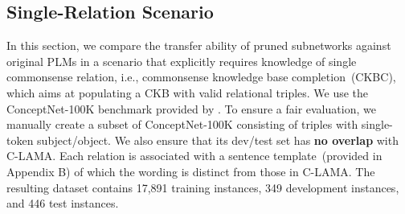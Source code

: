 \subsection{Single-Relation Scenario}
\label{sec:ckbc}
In this section, we compare the transfer ability of pruned subnetworks against original PLMs in 
a scenario that explicitly requires knowledge of single commonsense relation, 
i.e., commonsense knowledge base completion~(CKBC), which aims at populating a CKB with 
valid relational triples. We use the ConceptNet-100K benchmark provided by \citet{Li2016}. 
To ensure a fair evaluation, we manually create a subset of ConceptNet-100K 
consisting of triples with single-token subject/object. 
We also ensure that its dev/test set has \textbf{no overlap} with C-LAMA.
Each relation is associated with a sentence template~(provided in 
Appendix B) of which the wording is distinct from those in C-LAMA. 
The resulting dataset contains 17,891 training instances, 349 development instances, 
and 446 test instances.







